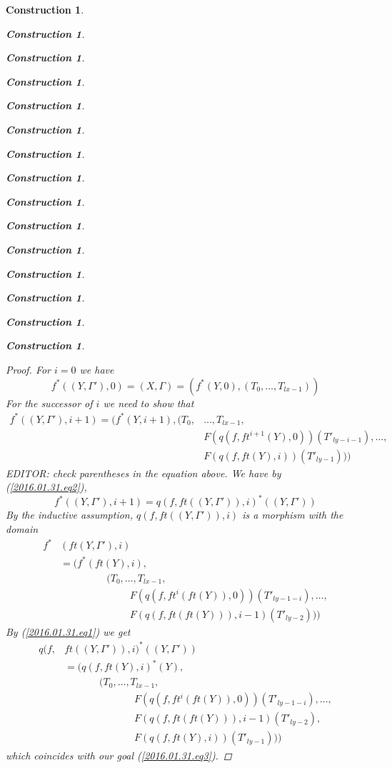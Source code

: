 \documentclass[12pt]{amsart}
\numberwithin{proposition}{subsection}
\newtheorem{construction}[proposition]{Construction}
\newcommand{\llabel}[1]{\label{#1}}
\newcommand{\spc}{{\,\,\,\,\,\,\,}}
\begin{document}
\begin{construction}
\begin{construction}
\begin{construction}
\begin{construction}
\begin{construction}
\begin{construction}
\begin{construction}
\begin{construction}
\begin{construction}
\begin{construction}
\begin{construction}
\begin{construction}
\begin{construction}
\begin{construction}
\begin{construction}
\begin{proof}
For $i=0$ we have 
%
$$f^*((Y,\Gamma'),0)=(X,\Gamma)=(f^*(Y,0),(T_0,\dots,T_{lx-1}))$$
%
For the successor of $i$ we need to show that
%
\begin{equation}\llabel{2016.01.31.eq3}
  \begin{split}
    f^*((Y,\Gamma'),i+1)=(f^*(Y,i+1),(T_0,&\dots,T_{lx-1},
    \\
    &
    F(q(f,ft^{i+1}(Y),0))(T'_{ly-i-1}),\dots,
    \\
    &
    F(q(f,ft(Y),i))(T'_{ly-1})))
  \end{split}
\end{equation}%
EDITOR: check parentheses in the equation above.
%
We have by (\ref{2016.01.31.eq2}),  
%
$$f^*((Y,\Gamma'),i+1)=q(f,ft((Y,\Gamma')),i)^*((Y,\Gamma'))$$
%
By the inductive assumption, $q(f,ft((Y,\Gamma')),i)$ is a morphism with the domain
%
\begin{equation*}
  \begin{split}
    f^*&(ft(Y,\Gamma'),i)
    \\&=
    (f^*(ft(Y),i),
    \\&
       \spc\spc\spc\spc (T_0,\dots,T_{lx-1},
    \\&
          \spc\spc\spc\spc\spc\spc F(q(f,ft^{i}(ft(Y)),0))(T'_{ly-1-i}),\dots,
    \\&
          \spc\spc\spc\spc\spc\spc F(q(f,ft(ft(Y))),i-1)(T'_{ly-2})
          ))
  \end{split}
\end{equation*}
%
By (\ref{2016.01.31.eq1}) we get
%
\begin{equation*}
  \begin{split}
    q(f,&ft((Y,\Gamma')),i)^*((Y,\Gamma'))
    \\&=
    (q(f,ft(Y),i)^*(Y),
    \\&
    \spc\spc\spc (T_0,\dots,T_{lx-1},
    \\&
    \spc\spc\spc\spc\spc\spc F(q(f,ft^{i}(ft(Y)),0))(T'_{ly-1-i}),\dots,
    \\&
    \spc\spc\spc\spc\spc\spc F(q(f,ft(ft(Y))),i-1)(T'_{ly-2}),
    \\&
    \spc\spc\spc\spc\spc\spc F(q(f,ft(Y),i))(T'_{ly-1})))
  \end{split}
\end{equation*}
%
which coincides with our goal (\ref{2016.01.31.eq3}). 
\end{proof}
%


\end{construction}
\end{construction}
\end{construction}
\end{construction}
\end{construction}
\end{construction}
\end{construction}
\end{construction}
\end{construction}
\end{construction}
\end{construction}
\end{construction}
\end{construction}
\end{construction}
\end{construction}
\end{document}
